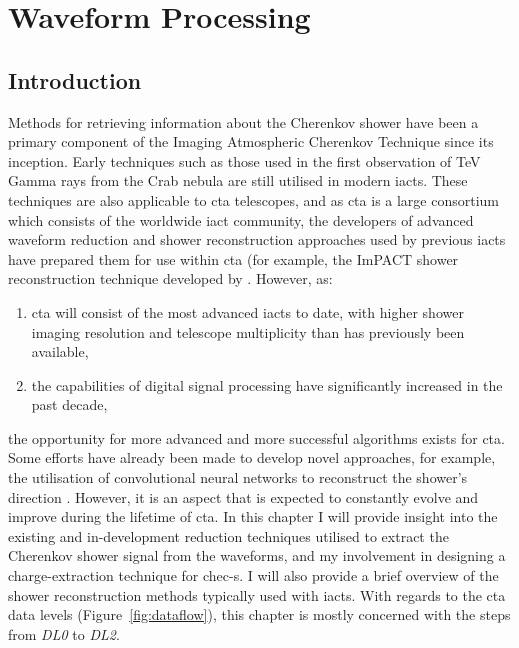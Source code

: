 \chapter{\label{ch6-reduction}Waveform Processing} 

\minitoc

\section{Introduction}

Methods for retrieving information about the Cherenkov shower have been a primary component of the Imaging Atmospheric Cherenkov Technique since its inception. Early techniques such as those used in the first observation of TeV Gamma rays from the Crab nebula \cite{Weekes1989} are still utilised in modern \glspl{iact}. These techniques are also applicable to \gls{cta} telescopes, and as \gls{cta} is a large consortium which consists of the worldwide \gls{iact} community, the developers of advanced waveform reduction and shower reconstruction approaches used by previous \glspl{iact} have prepared them for use within \gls{cta} (for example, the ImPACT shower reconstruction technique developed by \cite{Parsons2014}. However, as:
\begin{enumerate}[label=(\alph*)]
	\item \gls{cta} will consist of the most advanced \glspl{iact} to date, with higher shower imaging resolution and telescope multiplicity than has previously been available,
	\item the capabilities of digital signal processing have significantly increased in the past decade,
\end{enumerate}
the opportunity for more advanced and more successful algorithms exists for \gls{cta}. Some efforts have already been made to develop novel approaches, for example, the utilisation of convolutional neural networks to reconstruct the shower's direction \cite{Shilon2018}. However, it is an aspect that is expected to constantly evolve and improve during the lifetime of \gls{cta}. In this chapter I will provide insight into the existing and in-development reduction techniques utilised to extract the Cherenkov shower signal from the waveforms, and my involvement in designing a charge-extraction technique for \gls{chec-s}. I will also provide a brief overview of the shower reconstruction methods typically used with \glspl{iact}. With regards to the \gls{cta} data levels (Figure~\ref{fig:dataflow}), this chapter is mostly concerned with the steps from \textit{DL0} to \textit{DL2}.

